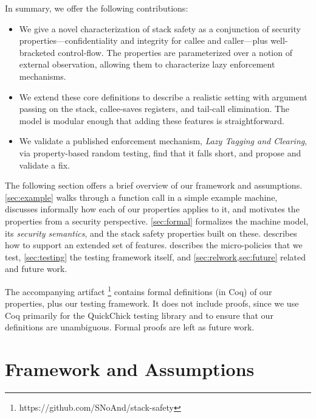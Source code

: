 \documentclass[10pt,conference]{ieeetran}%
\theoremstyle{definition}
\begin{document}
In summary, we offer the following contributions:

\begin{itemize}
\item We give a novel characterization of stack safety as a conjunction
  of security properties---confidentiality and integrity for callee
  and caller---plus well-bracketed control-flow.
  The properties are parameterized over a notion of
  external observation, allowing them to characterize lazy enforcement
  mechanisms.
\item We extend these core definitions to
  describe a realistic setting with argument passing on the stack,
  callee-saves registers, and tail-call elimination. The model is
  modular enough that adding these features is straightforward.
\item We validate a published enforcement mechanism, \emph{Lazy
  Tagging and Clearing}, via property-based random testing, find that
it falls short, and propose and validate a fix.
\end{itemize}
%
The following section offers a brief overview of our framework and
assumptions. \cref{sec:example} walks through a function call in
a simple example machine, discusses informally how each of our properties
applies to it, and motivates the properties
from a security perspective.
%
\cref{sec:formal} formalizes the machine model,
its {\em security semantics}, and the stack safety properties built on these.
 describes how to support an extended set of features.
 describes the micro-policies that we test,
\cref{sec:testing} the testing framework itself, and
\cref{sec:relwork,sec:future} related and future work.

The accompanying artifact \footnote{https://github.com/SNoAnd/stack-safety}
contains formal definitions (in Coq) of our
properties, plus our testing framework.  It does not include proofs, since
we use Coq primarily for the QuickChick testing library and to
ensure that our definitions are unambiguous.  Formal proofs are left
as future work.

\section{Framework and Assumptions}
\label{sec:ideas}
\end{document}
